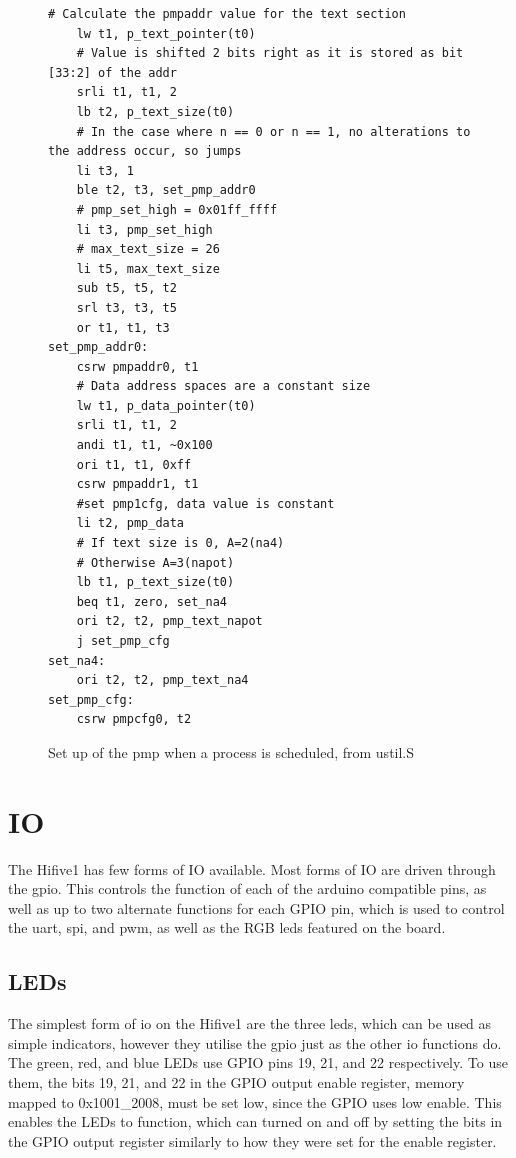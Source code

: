 \begin{figure}[H]
\begin{lstlisting}[language={[RISC-V]Assembler}]
    # Calculate the pmpaddr value for the text section
    lw t1, p_text_pointer(t0)
    # Value is shifted 2 bits right as it is stored as bit [33:2] of the addr
    srli t1, t1, 2
    lb t2, p_text_size(t0)
    # In the case where n == 0 or n == 1, no alterations to the address occur, so jumps
    li t3, 1
    ble t2, t3, set_pmp_addr0
    # pmp_set_high = 0x01ff_ffff
    li t3, pmp_set_high
    # max_text_size = 26
    li t5, max_text_size
    sub t5, t5, t2
    srl t3, t3, t5
    or t1, t1, t3
set_pmp_addr0:
    csrw pmpaddr0, t1
    # Data address spaces are a constant size
    lw t1, p_data_pointer(t0)
    srli t1, t1, 2
    andi t1, t1, ~0x100
    ori t1, t1, 0xff
    csrw pmpaddr1, t1
    #set pmp1cfg, data value is constant
    li t2, pmp_data
    # If text size is 0, A=2(na4)
    # Otherwise A=3(napot)
    lb t1, p_text_size(t0)
    beq t1, zero, set_na4
    ori t2, t2, pmp_text_napot
    j set_pmp_cfg
set_na4:
    ori t2, t2, pmp_text_na4
set_pmp_cfg:
    csrw pmpcfg0, t2
\end{lstlisting}
\centering
\caption[PMP setup]{Set up of the \ac{pmp} when a process is scheduled, from ustil.S}
\end{figure}
\section{IO}
The Hifive1 has few forms of IO available. Most forms of IO are driven through the \ac{gpio}. This controls the function of each of the arduino compatible pins, as well as up to two alternate functions for each GPIO pin, which is used to control the \ac{uart}, \ac{spi}, and \ac{pwm}, as well as the RGB leds featured on the board. 
\subsection{LEDs}
The simplest form of \ac{io} on the Hifive1 are the three leds, which can be used as simple indicators, however they utilise the \ac{gpio} just as the other \ac{io} functions do. The green, red, and blue LEDs use GPIO pins 19, 21, and 22 respectively. To use them, the bits 19, 21, and 22 in the GPIO output enable register, memory mapped to 0x1001\_2008, must be set low, since the GPIO uses low enable. This enables the LEDs to function, which can turned on and off by setting the bits in the GPIO output register similarly to how they were set for the enable register.
